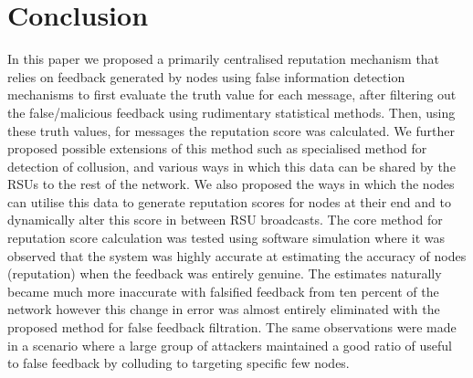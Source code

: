 \documentclass[journal]{IEEEtran}
\begin{document}
\section{Conclusion}
\label{sec:Conclusion}
In this paper we proposed a primarily centralised reputation mechanism that relies on feedback generated by nodes using false information detection mechanisms to first evaluate the truth value for each message, after filtering out the false/malicious feedback using rudimentary statistical methods. Then, using these truth values, for messages the reputation score was calculated. We further proposed possible extensions of this method such as specialised method for detection of collusion, and various ways in which this data can be shared by the RSUs to the rest of the network. We also proposed the ways in which the nodes can utilise this data to generate reputation scores for nodes at their end and to dynamically alter this score in between RSU broadcasts. The core method for reputation score calculation was tested using software simulation where it was observed that the system was highly accurate at estimating the accuracy of nodes (reputation) when the feedback was entirely genuine. The estimates naturally became much more inaccurate with falsified feedback from ten percent of the network however this change in error was almost entirely eliminated with the proposed method for false feedback filtration. The same observations were made in a scenario where a large group of attackers maintained a good ratio of useful to false feedback by colluding to targeting specific few nodes.


%
\end{document}
